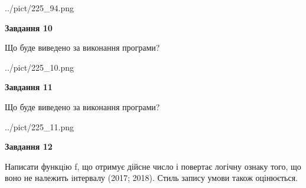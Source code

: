 \documentclass[12pt, ukrainian]{article}
\begin{document}
{\begin {large}
\begin{center}
	{../pict/225_94.png}
\end{center}
\newpage

{\begin {center}\textbf{Завдання 10}\end {center}}

Що буде виведено за виконання програми?\par
\begin{center}
	{../pict/225_10.png}
\end{center}
\newpage

{\begin {center}\textbf{Завдання 11}\end {center}}

Що буде виведено за виконання програми?\par
\begin{center}
	{../pict/225_11.png}
\end{center}
\newpage

{\begin {center}\textbf{Завдання 12}\end {center}}


Написати функцiю f, що отримує дійсне число і повертає логічну ознаку того, що воно не належить iнтервалу (2017; 2018). Стиль запису умови також оцінюється.\par
\newpage

\end {large}}
\end{document}
